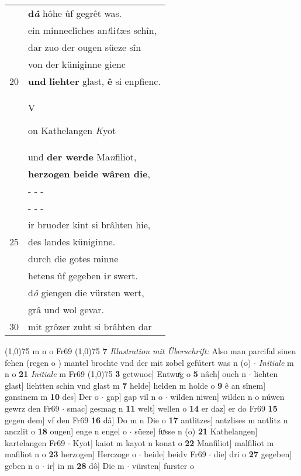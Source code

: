 \documentclass[8pt,a4paper,notitlepage]{article}
\begin{document}
\begin{table}[ht]
\begin{minipage}[t]{0.5\linewidth}
\begin{tabular}{rl}
 & \textbf{d\textit{â}} hôhe ûf gegrêt was.\\ 
 & ein minneclîches an\textit{t}li\textit{tz}es schîn,\\ 
 & dar zuo der ougen süeze sîn\\ 
 & von der küniginne gienc\\ 
20 & \textbf{und} \textbf{liehter} glast, \textbf{ê} si  enpfienc.\\ 
 & \begin{large}V\end{large}on Kathelangen \textit{K}yot\\ 
 & und \textbf{der werde} Ma\textit{n}filiot,\\ 
 & \textbf{herzogen beide wâren die},\\ 
 & \multicolumn{1}{l}{ - - - }\\ 
 & \multicolumn{1}{l}{ - - - }\\ 
 & ir bruoder kint si brâhten hie,\\ 
25 & des landes küniginne.\\ 
 & durch die gotes minne\\ 
 & hetens ûf gegeben i\textit{r} swert.\\ 
 & d\textit{ô} giengen die vürsten wert,\\ 
 & grâ und wol gevar.\\ 
30 & mit grôzer zuht si brâhten dar\\ 
\end{tabular}
\scriptsize
\line(1,0){75} \newline
m n o Fr69 \newline
\line(1,0){75} \newline
\textbf{7} \textit{Illustration mit Überschrift:} Also man parcifal sinen fehen (regen o  ) mantel brochte vnd der mit zobel gefútert was n (o)   $\cdot$ \textit{Initiale} m n o  \textbf{21} \textit{Initiale} m Fr69  \newline
\line(1,0){75} \newline
\textbf{3} getwuoc] Entwuͯg o \textbf{5} nâch] ouch n  $\cdot$ liehten glast] liehtten schin vnd glast m \textbf{7} helde] helden m holde o \textbf{9} ê an sînem] gansinem m \textbf{10} des] Der o  $\cdot$ gap] gap vil n o  $\cdot$ wilden niwen] wilden n o núwen gewrz den Fr69  $\cdot$ smac] gesmag n \textbf{11} welt] wellen o \textbf{14} er daz] er do Fr69 \textbf{15} gegen dem] vf den Fr69 \textbf{16} dâ] Do m n Die o \textbf{17} antlitzes] antzlises m antlitz n anczlit o \textbf{18} ougen] enge n engel o  $\cdot$ süeze] fuͯsse n (o) \textbf{21} Kathelangen] kartelangen Fr69  $\cdot$ Kyot] kaiot m kayot n konat o \textbf{22} Manfiliot] malfiliot m mafiliot n o \textbf{23} herzogen] Herczoge o  $\cdot$ beide] beidv Fr69  $\cdot$ die] dri o \textbf{27} gegeben] geben n o  $\cdot$ ir] in m \textbf{28} dô] Die m  $\cdot$ vürsten] furster o \newline
\end{minipage}
\end{table}
\end{document}
